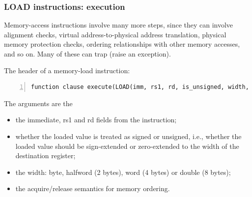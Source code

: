 \documentclass[aspectratio=169]{beamer}
\newcommand{\slidefont}{\scriptsize}
\begin{document}
\begin{frame}[fragile]
  \frametitle{LOAD instructions: execution}

  \slidefont

  Memory-access instructions involve many more steps, since they can
  involve alignment checks, virtual address-to-physical address
  translation, physical memory protection checks, ordering
  relationships with other memory accesses, and so on.  Many of these
  can trap (raise an exception).

  \vspace{1ex}

  The header of a memory-load instruction:

  \vspace{1ex}

  \begin{Verbatim}[frame=single, numbers=left, label = File riscv\_insts\_base.sail]
function clause execute(LOAD(imm, rs1, rd, is_unsigned, width, aq, rl)) = {
  \end{Verbatim}

  \begin{minipage}{\textwidth}
    The arguments are the
    \begin{itemize}
    \item the immediate, rs1 and rd fields from the instruction;

    \item whether the loaded value is treated as signed or unsigned,
      i.e., whether the loaded value should be sign-extended or
      zero-extended to the width of the destination register;

    \item the width: byte, halfword (2 bytes), word (4 bytes) or double (8 bytes);

    \item the acquire/release semantics for memory ordering.
    \end{itemize}
  \end{minipage}

\end{frame}

\end{document}
